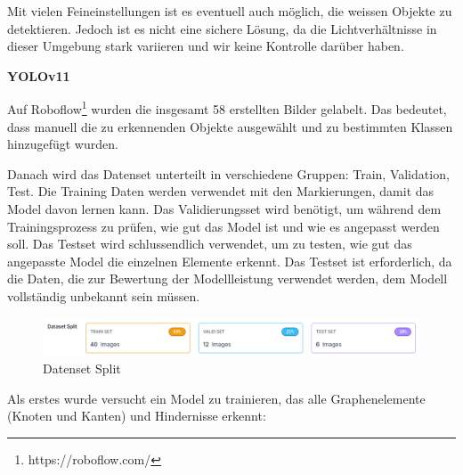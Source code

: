 Mit vielen Feineinstellungen ist es eventuell auch möglich, die weissen Objekte zu detektieren. Jedoch ist es nicht eine sichere Lösung, da die Lichtverhältnisse in dieser Umgebung stark variieren und wir keine Kontrolle darüber haben.

\textbf{YOLOv11}

Auf Roboflow\footnote{https://roboflow.com/} wurden die insgesamt 58 erstellten Bilder gelabelt.
Das bedeutet, dass manuell die zu erkennenden Objekte ausgewählt und zu bestimmten Klassen hinzugefügt wurden.

Danach wird das Datenset unterteilt in verschiedene Gruppen: Train, Validation, Test. Die Training Daten werden verwendet mit den Markierungen, damit das Model davon lernen kann. Das Validierungsset wird benötigt, um während dem Trainingsprozess zu prüfen, wie gut das Model ist und wie es angepasst werden soll. Das Testset wird schlussendlich verwendet, um zu testen, wie gut das angepasste Model die einzelnen Elemente erkennt. Das Testset ist erforderlich, da die Daten, die zur Bewertung der Modellleistung verwendet werden, dem Modell vollständig unbekannt sein müssen.
\begin{figure}[H]
    \centering
    \includegraphics[width=\linewidth]{assets/informatik-prototyp/yolo/dataset-split.png}
    \caption{Datenset Split}
    \label{fig:data-split}
\end{figure}

Als erstes wurde versucht ein Model zu trainieren, das alle Graphenelemente (Knoten und Kanten) und Hindernisse erkennt:


